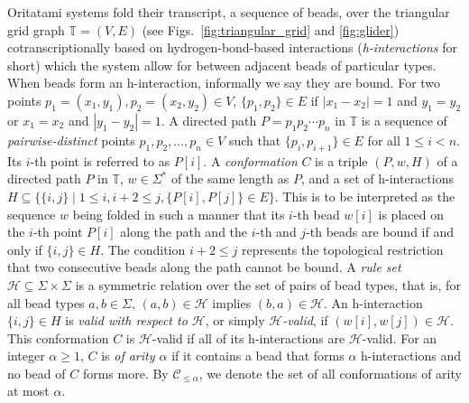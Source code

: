 \documentclass[runningheads]{llncs}
\begin{document}
Oritatami systems fold their transcript, a sequence of beads, over the triangular grid graph $\mathbb{T} = (V, E)$ (see Figs.~\ref{fig:triangular_grid} and \ref{fig:glider}) cotranscriptionally based on hydrogen-bond-based interactions (\textit{h-interactions} for short) which the system allow for between adjacent beads of particular types. 
When beads form an h-interaction, informally we say they are bound. 
For two points $p_1 = (x_1, y_1), p_2 = (x_2, y_2) \in V$, $\{p_1, p_2\} \in E$ if $|x_1 - x_2| = 1$ and $y_1 = y_2$ or $x_1 = x_2$ and $|y_1 - y_2| = 1$. 
A directed path $P = p_1 p_2 \cdots p_n$ in $\mathbb{T}$ is a sequence of \textit{pairwise-distinct} points $p_1, p_2, \ldots, p_n \in V$ such that $\{p_i, p_{i+1}\} \in E$ for all $1 \leq i < n$.
Its $i$-th point is referred to as $P[i]$. 
A \textit{conformation} $C$ is a triple $(P, w, H)$ of a directed path $P$ in $\mathbb{T}$, $w \in \Sigma^*$ of the same length as $P$, and a set of h-interactions $H \subseteq \{\{i,j\} \mid 1 \leq i, i+2 \leq j, \{P[i], P[j]\} \in E\}$.
This is to be interpreted as the sequence $w$ being folded in such a manner that its $i$-th bead $w[i]$ is placed on the $i$-th point $P[i]$ along the path and the $i$-th and $j$-th beads are bound if and only if $\{i, j\} \in H$. 
The condition $i+2 \leq j$ represents the topological restriction that two consecutive beads along the path cannot be bound.
A \textit{rule set} $\mathcal{H} \subseteq \Sigma \times \Sigma$ is a symmetric relation over the set of pairs of bead types, that is, for all bead types $a, b \in \Sigma$, $(a, b) \in \mathcal{H}$ implies $(b, a) \in \mathcal{H}$. 
An h-interaction $\{i, j\} \in H$ is \textit{valid with respect to $\mathcal{H}$}, or simply \textit{$\mathcal{H}$-valid}, if $(w[i], w[j]) \in \mathcal{H}$. 
This conformation $C$ is $\mathcal{H}$-valid if all of its h-interactions are $\mathcal{H}$-valid. 
For an integer $\alpha \ge 1$, $C$ is \textit{of arity $\alpha$} if it contains a bead that forms $\alpha$ h-interactions and no bead of $C$ forms more. 
By $\mathcal{C}_{\le \alpha}$, we denote the set of all conformations of arity at most $\alpha$.
\end{document}
